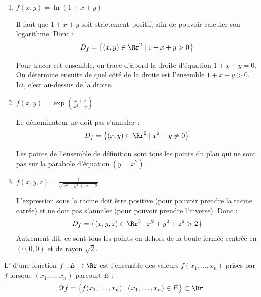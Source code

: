 \documentclass[11pt, class=report,crop=false]{standalone}
\begin{document}
\begin{exemple}
\sauteligne
\begin{enumerate}
  \item $f(x,y) = \ln(1 + x + y)$

  Il faut que $1+x+y$ soit strictement positif, afin de pouvoir calculer son logarithme. Donc :
  $$D_f = \left\{ (x,y)\in \Rr^2 \mid 1+x+y >0 \right\}$$
  
  Pour tracer cet ensemble, on trace d'abord la droite  d'équation $1+x+y=0$. On détermine ensuite de quel côté de la droite est l'ensemble $1+x+y>0$. Ici, c'est au-dessus de la droite.
  

  \item $f(x,y) = \exp\left(\frac{x+y}{x^2-y}\right)$
  
  Le dénominateur ne doit pas s'annuler :  
  $$D_f = \left\{ (x,y)\in \Rr^2 \mid x^2-y \neq 0 \right\}$$
  
  Les points de l'ensemble de définition sont tous les points du plan qui ne sont pas sur la parabole d'équation $(y=x^2)$.
  

  \item $f(x,y,z) = \frac {1}{\sqrt{x^2 + y^2 + z^2 - 2}}$
  
   L'expression sous la racine doit être positive (pour pouvoir prendre la racine carrée) et ne doit pas s'annuler (pour pouvoir prendre l'inverse). Donc :
  $$D_f = \left\{ (x,y,z)\in \Rr^3 \mid x^2+y^2+z^2 > 2 \right\}$$
  Autrement dit, ce sont tous les points en dehors de la boule fermée centrée en $(0,0,0)$ et de rayon $\sqrt 2$.
  
      
  
\end{enumerate}
\end{exemple}



\begin{definition}
L' d'une fonction $f : E \to \Rr$ est l'ensemble des valeurs $f(x_1,\ldots,x_n)$ prises par $f$ lorsque $(x_1,\ldots,x_n)$ parcourt $E$ :
$$\Im f = \big\{ f(x_1,\ldots,x_n) \mid (x_1,\ldots,x_n) \in E \big\} \subset \Rr$$
\end{definition}
\end{document}

